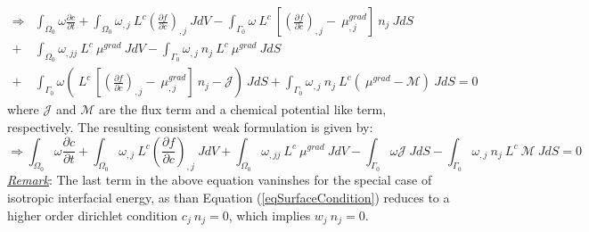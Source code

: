 \begin{align}
\Rightarrow &\int_{\Omega_0}  \omega \frac{\partial  c }{\partial t} + \int_{\Omega_0}  \omega_{,j} ~L^c \left(\frac{\partial f}{\partial c}\right)_{,j} ~J dV -\int_{\Gamma_0}  \omega ~L^c ~\left[ \left(\frac{\partial f}{\partial c}\right)_{,j} - ~\mu^{grad}_{,j} \right] ~n_{j} ~J dS  \nonumber \\
+ &\int_{\Omega_0}  \omega_{,jj} ~L^c ~\mu^{grad} ~J dV - \int_{\Gamma_0}  \omega_{,j}  ~n_{j} ~L^c ~\mu^{grad} ~J dS  \nonumber \\
+ &\int_{\Gamma_0}  \omega \left(  ~L^c ~\left[ \left(\frac{\partial f}{\partial c}\right)_{,j} - ~\mu^{grad}_{,j} \right] ~n_{j} -\mathcal{J} \right)~J dS + \int_{\Gamma_0} \omega_{,j}  ~n_{j}   ~L^c \left(~\mu^{grad}  - \mathcal{M} \right) ~J dS = 0
\label{eqWeakC3}
\end{align}
where $\mathcal{J}$ and $\mathcal{M}$ are the flux term and a chemical potential like term, respectively. The resulting consistent weak formulation is given by:
\begin{equation}
\Rightarrow \int_{\Omega_0}  \omega \frac{\partial  c }{\partial t} + \int_{\Omega_0}  \omega_{,j} ~L^c \left(\frac{\partial f}{\partial c}\right)_{,j} ~J dV + \int_{\Omega_0}  \omega_{,jj} ~L^c ~\mu^{grad} ~J dV
- \int_{\Gamma_0}  \omega \mathcal{J} ~J dS - \int_{\Gamma_0} \omega_{,j}  ~n_{j} ~L^c ~\mathcal{M} ~J dS = 0
\label{eqWeakC}
\end{equation}
\underline{\emph{Remark}}: The last term in the above equation vaninshes for the special case of isotropic interfacial energy, as than Equation (\ref{eqSurfaceCondition}) reduces to a higher order dirichlet condition $c_j~n_j=0$, which implies $w_j~n_j=0$. 

